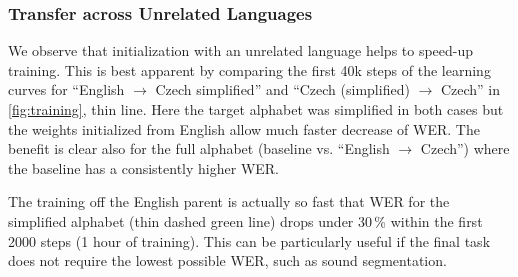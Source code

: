 \subsubsection{Transfer across Unrelated Languages}

We observe that initialization %
with an unrelated language helps to speed-up training.
This is best apparent by comparing the first 40k steps of the learning curves for ``English
$\rightarrow$ Czech simplified'' and ``Czech (simplified) $\rightarrow$ Czech''
in \cref{fig:training}, thin line. Here the target alphabet was simplified in
both cases but the weights
initialized from English allow much faster decrease of WER. The benefit is clear
also for the full alphabet (baseline vs. ``English $\rightarrow$ Czech'') where
the baseline has a consistently higher WER.

The training off the English parent is actually so fast that WER for the
simplified alphabet (thin dashed green line) drops under 30\,\% within the first 2000
steps (1 hour of training).
This can be particularly useful if the final
task does not require the lowest possible WER, such as sound segmentation.

